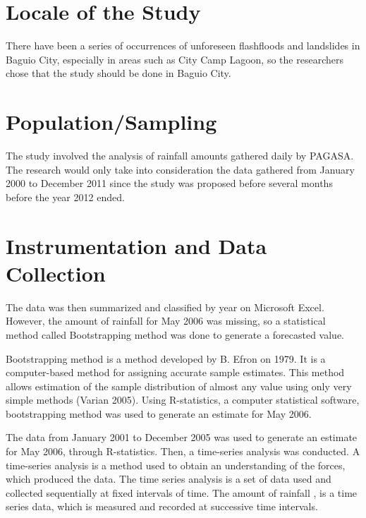\section*{Locale of the Study}

There have been a series of occurrences of unforeseen flashfloods and landslides in Baguio City, especially in areas such as City Camp Lagoon, so the researchers chose that the study should be done in Baguio City.

\section*{Population/Sampling}

The study involved the analysis of rainfall amounts gathered daily by PAGASA. The research would only take into consideration the data gathered from January 2000 to December 2011 since the study was proposed before several months before the year 2012 ended.

\section*{Instrumentation and Data Collection}

The data was then summarized and classified by year on Microsoft Excel. However, the amount of rainfall for May 2006 was missing, so a statistical method called Bootstrapping method was done to generate a forecasted value. 

Bootstrapping method is a method developed by B. Efron on 1979. It is a computer-based method for assigning accurate sample estimates. This method allows estimation of the sample distribution of almost any value using only very simple methods (Varian 2005). Using R-statistics, a computer statistical software, bootstrapping method was used to generate an estimate for May 2006. 

The data from January 2001 to December 2005 was used to generate an estimate for May 2006, through R-statistics.
Then, a time-series analysis was conducted. A time-series analysis is a method used to obtain an understanding of the forces, which produced the data. The time series analysis is a set of data used and collected sequentially at fixed intervals of time. The amount of rainfall , is a time series data, which is measured and recorded at successive time intervals.

